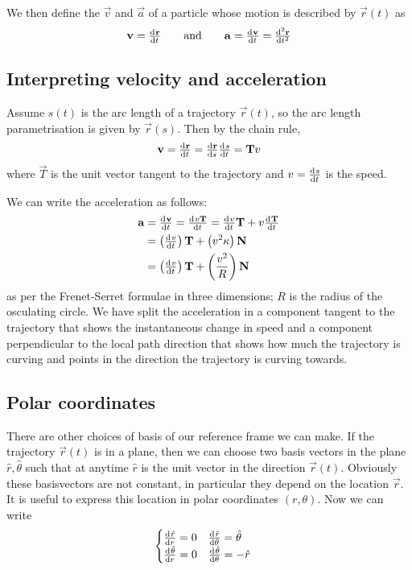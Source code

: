 We then define the  $\vec{v}$ and  $\vec{a}$ of a particle whose motion is described by $\vec{r}(t)$ as
\[ \vec{v} = \od{\vec{r}}{t} \qquad \text{and} \qquad \vec{a} = \od{\vec{v}}{t} = \od[2]{\vec{r}}{t} \]

\subsection{Interpreting velocity and acceleration}
Assume $s(t)$ is the arc length of a trajectory $\vec{r}(t)$, so the arc length parametrisation is given by $\vec{r}(s)$. Then by the chain rule,
\begin{align*}
\vec{v} = \od{\vec{r}}{t} = \od{\vec{r}}{s}\od{s}{t} = \vec{T}v
\end{align*}
where $\vec{T}$ is the unit vector tangent to the trajectory and $v = \od{s}{t}$ is the speed.

We can write the acceleration as follows:
\begin{align*}
\vec{a} &= \od{\vec{v}}{t} = \od{v\vec{T}}{t} = \od{v}{t}\vec{T} + v \od{\vec{T}}{t} \\
&= \left(\od{v}{t}\right)\vec{T} + \left(v^2 \kappa\right)\vec{N} \\
&= \left(\od{v}{t}\right)\vec{T} + \left(\frac{v^2}{R}\right)\vec{N}
\end{align*} 
as per the Frenet-Serret formulae in three dimensions; $R$ is the radius of the osculating circle. We have split the acceleration in a component tangent to the trajectory that shows the instantaneous change in speed and a component perpendicular to the local path direction that shows how much the trajectory is curving and points in the direction the trajectory is curving towards.

\subsection{Polar coordinates}
There are other choices of basis of our reference frame we can make. If the trajectory $\vec{r}(t)$ is in a plane, then we can choose two basis vectors in the plane $\hat{r}, \hat{\theta}$ such that at anytime $\hat{r}$ is the unit vector in the direction $\vec{r}(t)$. Obviously these basisvectors are not constant, in particular they depend on the location $\vec{r}$. It is useful to express this location in polar coordinates $(r,\theta)$. Now we can write
\[ \begin{cases}
\od{\hat{r}}{r} = 0 \quad \od{\hat{r}}{\theta} = \hat{\theta} \\
\od{\hat{\theta}}{r} = 0 \quad \od{\hat{\theta}}{\theta} = - \hat{r}
\end{cases} \]

